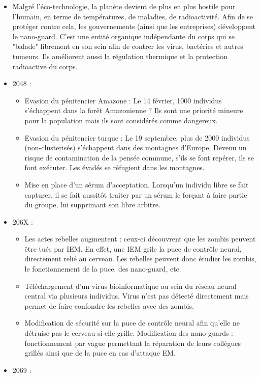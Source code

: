 \begin{itemize}
\begin{itemize}
		\item Malgré l'éco-technologie, la planète devient de plus en plus hostile pour l'humain, en terme de températures, de maladies, de radioactivité. Afin de se protéger contre cela, les gouvernements (ainsi que les entreprises) développent le nano-guard. C'est une entité organique indépendante du corps qui se "balade" librement en son sein afin de contrer les virus, bactéries et autres tumeurs. Ils améliorent aussi la régulation thermique et la protection radioactive du corps.
		\item 2048 : \begin{itemize}
		\item Evasion du pénitencier Amazone : Le 14 février, 1000 individus s'échappent dans la forêt Amazonienne ? Ils sont une priorité mineure pour la population mais ils sont considérés comme dangereux.
		\item Evasion du pénitencier turque : Le 19 septembre, plus de 2000 individus (non-clusterisés) s'échappent dans des montagnes d'Europe. Devenu un risque de contamination de la pensée commune, s'ils se font repérer, ils se font exécuter. Les évadés se réfugient dans les montagnes.
		\item Mise en place d'un sérum d'acceptation. Lorsqu'un individu libre se fait capturer, il se fait aussitôt traiter par un sérum le forçant à faire partie du groupe, lui supprimant son libre arbitre.
	\end{itemize}
	\item 206X : \begin{itemize}
		\item Les actes rebelles augmentent : ceux-ci découvrent que les zombis peuvent être tués par IEM. En effet, une IEM grile la puce de contrôle neural, directement relié au cerveau. Les rebelles peuvent donc étudier les zombis, le fonctionnement de la puce, des nano-guard, etc.
		\item Téléchargement d'un virus bioinformatique au sein du réseau neural central via plusieurs individus. Virus n'est pas détecté directement mais permet de faire confondre les rebelles avec des zombis.
		\item Modification de sécurité sur la puce de contrôle neural afin qu'elle ne détruise pas le cerveau si elle grille. Modification des nano-guards : fonctionnement par vague permettant la réparation de leurs collègues grillés ainsi que de la puce en cas d'attaque EM.
	\end{itemize}
	\item 2069 : \begin{itemize}

\end{itemize}
\end{itemize}
\end{itemize}
